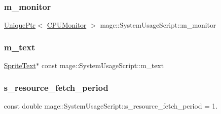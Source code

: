 \subsubsection{\texorpdfstring{m\+\_\+monitor}{m\_monitor}}
{\footnotesize\ttfamily \hyperlink{namespacemage_a3316d7143a973e37adf1110f2e80ca31}{Unique\+Ptr}$<$ \hyperlink{classmage_1_1_c_p_u_monitor}{C\+P\+U\+Monitor} $>$ mage\+::\+System\+Usage\+Script\+::m\+\_\+monitor\hspace{0.3cm}{\ttfamily [private]}}

\hypertarget{classmage_1_1_system_usage_script_a8875656163d9c9dfdfadd02c4e008eff}{}\label{classmage_1_1_system_usage_script_a8875656163d9c9dfdfadd02c4e008eff} 
\subsubsection{\texorpdfstring{m\+\_\+text}{m\_text}}
{\footnotesize\ttfamily \hyperlink{classmage_1_1_sprite_text}{Sprite\+Text}$\ast$ const mage\+::\+System\+Usage\+Script\+::m\+\_\+text\hspace{0.3cm}{\ttfamily [private]}}

\hypertarget{classmage_1_1_system_usage_script_a1c6b08be09a34ebd4515f6c09622afbd}{}\label{classmage_1_1_system_usage_script_a1c6b08be09a34ebd4515f6c09622afbd} 
\subsubsection{\texorpdfstring{s\+\_\+resource\+\_\+fetch\+\_\+period}{s\_resource\_fetch\_period}}
{\footnotesize\ttfamily const double mage\+::\+System\+Usage\+Script\+::s\+\_\+resource\+\_\+fetch\+\_\+period = 1.\hspace{0.3cm}{\ttfamily [static]}}

